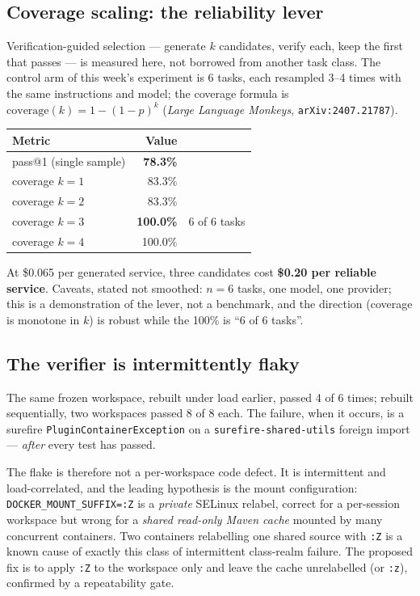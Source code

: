 \documentclass[11pt,a4paper]{article}
\begin{document}
\subsection{Coverage scaling: the reliability lever}

Verification-guided selection --- generate $k$ candidates, verify each, keep the
first that passes --- is measured here, not borrowed from another task class. The
control arm of this week's experiment is 6 tasks, each resampled 3--4 times with the
same instructions and model; the coverage formula is
$\mathrm{coverage}(k)=1-(1-p)^k$ (\emph{Large Language Monkeys},
\texttt{arXiv:2407.21787}).

\begin{center}
\begin{tabular}{@{}lrl@{}}
\toprule
\textbf{Metric} & \textbf{Value} & \\
\midrule
pass@1 (single sample) & \textbf{78.3\%} & \\
coverage $k{=}1$ & 83.3\% & \\
coverage $k{=}2$ & 83.3\% & \\
coverage $k{=}3$ & \textbf{100.0\%} & 6 of 6 tasks \\
coverage $k{=}4$ & 100.0\% & \\
\bottomrule
\end{tabular}
\end{center}

At \$0.065 per generated service, three candidates cost \textbf{\$0.20 per reliable
service}. Caveats, stated not smoothed: $n{=}6$ tasks, one model, one provider; this
is a demonstration of the lever, not a benchmark, and the direction (coverage is
monotone in $k$) is robust while the 100\% is ``6 of 6 tasks''.

\subsection{The verifier is intermittently flaky}

The same frozen workspace, rebuilt under load earlier, passed 4 of 6 times; rebuilt
sequentially, two workspaces passed 8 of 8 each. The failure, when it occurs, is a
surefire \texttt{PluginContainerException} on a \texttt{surefire-shared-utils}
foreign import --- \emph{after} every test has passed.

The flake is therefore not a per-workspace code defect. It is intermittent and
load-correlated, and the leading hypothesis is the mount configuration:
\texttt{DOCKER\_MOUNT\_SUFFIX=:Z} is a \emph{private} SELinux relabel, correct for a
per-session workspace but wrong for a \emph{shared read-only Maven cache} mounted by
many concurrent containers. Two containers relabelling one shared source with
\texttt{:Z} is a known cause of exactly this class of intermittent class-realm
failure. The proposed fix is to apply \texttt{:Z} to the workspace only and leave the
cache unrelabelled (or \texttt{:z}), confirmed by a repeatability gate.
\end{document}
